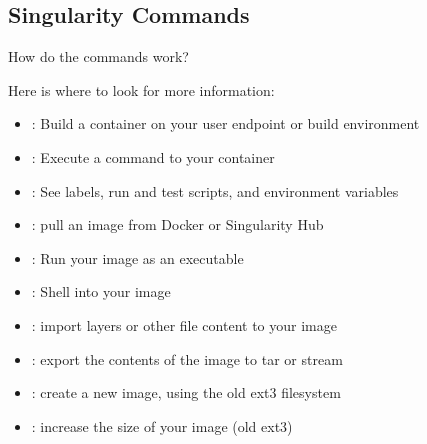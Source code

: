 \documentclass[letterpaper,10pt,english]{sphinxmanual}
\begin{document}
\subsection{Singularity Commands}
\label{\detokenize{introduction:singularity-commands}}
How do the commands work?

Here is where to look for more information:
\begin{itemize}
\item {} 
{\hyperref[\detokenize{appendix:build-command}]{}} : Build a container on your user endpoint or build environment

\item {} 
{\hyperref[\detokenize{appendix:exec-command}]{}} : Execute a command to your container

\item {} 
{\hyperref[\detokenize{appendix:inspect-command}]{}} : See labels, run and test scripts, and environment variables

\item {} 
{\hyperref[\detokenize{appendix:pull-command}]{}} : pull an image from Docker or Singularity Hub

\item {} 
{\hyperref[\detokenize{appendix:run-command}]{}} : Run your image as an executable

\item {} 
{\hyperref[\detokenize{appendix:shell-command}]{}} : Shell into your image

\end{itemize}

\begin{itemize}
\item {} 
{\hyperref[\detokenize{appendix:image-import}]{}} : import layers or other file content to your image

\item {} 
{\hyperref[\detokenize{appendix:image-export}]{}} : export the contents of the image to tar or stream

\item {} 
{\hyperref[\detokenize{appendix:image-create}]{}} : create a new image, using the old ext3 filesystem

\item {} 
{\hyperref[\detokenize{appendix:image-expand}]{}} : increase the size of your image (old ext3)

\end{itemize}
\end{document}
